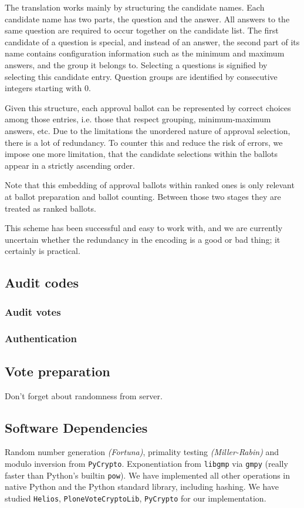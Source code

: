 \documentclass[letterpaper,10pt]{article}
\begin{document}
The translation works mainly by structuring the candidate names.
Each candidate name has two parts, the question and the answer.
All answers to the same question are required to occur together
on the candidate list.
The first candidate of a question is special,
and instead of an answer, the second part of its name contains
configuration information such as the minimum and maximum answers,
and the group it belongs to.
Selecting a questions is signified by selecting this candidate entry.
Question groups are identified by consecutive integers starting with 0.

Given this structure, each approval ballot can be represented by
correct choices among those entries, i.e. those that respect
grouping, minimum-maximum answers, etc.
Due to the limitations the unordered nature of approval selection,
there is a lot of redundancy.
To counter this and reduce the risk of errors, we impose one more
limitation, that the candidate selections within the ballots appear
in a strictly ascending order.

Note that this embedding of approval ballots within ranked ones is
only relevant at ballot preparation and ballot counting.
Between those two stages they are treated as ranked ballots.

This scheme has been successful and easy to work with,
and we are currently uncertain whether the redundancy in
the encoding is a good or bad thing; it certainly is practical.

\subsection{Audit codes}
\label{sec:audit_codes}
\subsubsection{Audit votes}
\subsubsection{Authentication}

\subsection{Vote preparation}
\label{sec:vote_preparation}
Don't forget about randomness from server.

\subsection{Software Dependencies}
Random number generation \emph{(Fortuna)}, primality testing
\emph{(Miller-Rabin)} and modulo inversion from \texttt{PyCrypto}.
Exponentiation from \texttt{libgmp} via \texttt{gmpy} (really faster
than Python's builtin \texttt{pow}). We have implemented all other
operations in native Python and the Python standard library, including
hashing. We have studied \texttt{Helios}, \texttt{PloneVoteCryptoLib},
\texttt{PyCrypto} for our implementation.
\end{document}
